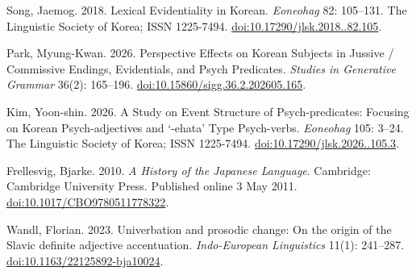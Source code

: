 Song, Jaemog. 2018.
Lexical Evidentiality in Korean.
\textit{Eoneohag} 82: 105--131.
The Linguistic Society of Korea; ISSN 1225-7494.
\href{https://doi.org/10.17290/jlsk.2018..82.105}{doi:10.17290/jlsk.2018..82.105}.

Park, Myung-Kwan. 2026.
Perspective Effects on Korean Subjects in Jussive / Commissive Endings,
Evidentials, and Psych Predicates.
\textit{Studies in Generative Grammar} 36(2): 165--196.
\href{https://doi.org/10.15860/sigg.36.2.202605.165}{doi:10.15860/sigg.36.2.202605.165}.

Kim, Yoon-shin. 2026.
A Study on Event Structure of Psych-predicates: Focusing on Korean
Psych-adjectives and `-ehata' Type Psych-verbs.
\textit{Eoneohag} 105: 3--24.
The Linguistic Society of Korea; ISSN 1225-7494.
\href{https://doi.org/10.17290/jlsk.2026..105.3}{doi:10.17290/jlsk.2026..105.3}.

Frellesvig, Bjarke. 2010.
\textit{A History of the Japanese Language}.
Cambridge: Cambridge University Press. Published online 3 May 2011.
\href{https://doi.org/10.1017/CBO9780511778322}{doi:10.1017/CBO9780511778322}.

Wandl, Florian. 2023.
Univerbation and prosodic change: On the origin of the Slavic definite adjective
accentuation.
\textit{Indo-European Linguistics} 11(1): 241--287.
\href{https://doi.org/10.1163/22125892-bja10024}{doi:10.1163/22125892-bja10024}.
